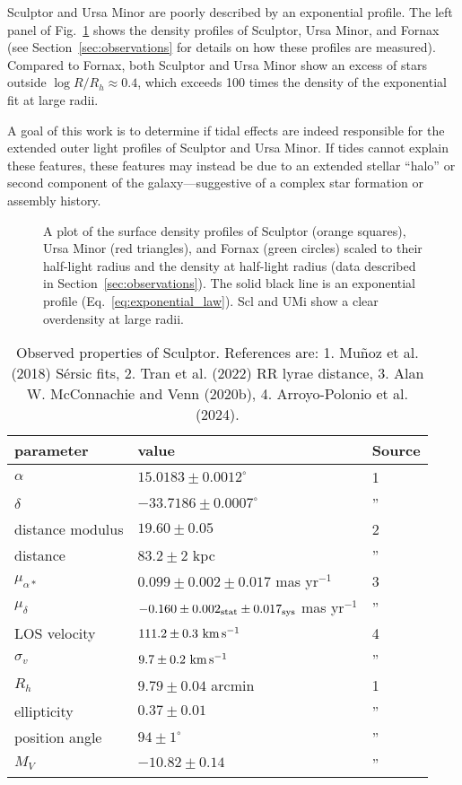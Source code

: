 Sculptor and Ursa Minor are poorly described by an exponential profile.
The left panel of Fig.~\ref{fig:scl_umi_vs_fornax} shows the density
profiles of Sculptor, Ursa Minor, and Fornax (see
Section~\ref{sec:observations} for details on how these profiles are
measured). Compared to Fornax, both Sculptor and Ursa Minor show an
excess of stars outside \(\log R/R_h\approx 0.4\), which exceeds 100
times the density of the exponential fit at large radii.

A goal of this work is to determine if tidal effects are indeed
responsible for the extended outer light profiles of Sculptor and Ursa
Minor. If tides cannot explain these features, these features may
instead be due to an extended stellar ``halo'' or second component of
the galaxy---suggestive of a complex star formation or assembly history.

\begin{figure}
\centering
{}
\caption[Scl and UMi have an extended density profile]{A plot of the
surface density profiles of Sculptor (orange squares), Ursa Minor (red
triangles), and Fornax (green circles) scaled to their half-light radius
and the density at half-light radius (data described in
Section~\ref{sec:observations}). The solid black line is an exponential
profile (Eq.~\ref{eq:exponential_law}). Scl and UMi show a clear
overdensity at large radii.}\label{fig:scl_umi_vs_fornax}
\end{figure}

\begin{table*}[t]
\centering
\caption[Observed Properties of Sculptor]{Observed properties of Sculptor. References are: 1. Muñoz et al. (2018) Sérsic fits, 2. Tran et al. (2022) RR lyrae distance, 3. Alan W. McConnachie and Venn (2020b), 4. Arroyo-Polonio et al. (2024). }
\label{tbl:scl_obs_props}
\begin{tabular}{lll}
\toprule
parameter & value & Source\\
\midrule
$\alpha$ & $15.0183 \pm 0.0012^\circ$ & 1\\
$\delta$ & $-33.7186 \pm 0.0007^\circ$ & ”\\
distance modulus & $19.60 \pm 0.05$ & 2\\
distance & $83.2 \pm 2$ kpc & ”\\
$\mu_{\alpha*}$ & $0.099 \pm 0.002 \pm 0.017$ mas yr$^{-1}$ & 3\\
$\mu_\delta$ & $-0.160 \pm 0.002_{\rm stat} \pm 0.017_{\rm sys}$ mas yr$^{-1}$ & ”\\
LOS velocity & $111.2 \pm 0.3\ {\rm km\,s^{-1}}$ & 4\\
$\sigma_v$ & $9.7\pm0.2\ {\rm km\,s^{-1}}$ & ”\\
$R_h$ & $9.79 \pm 0.04$ arcmin & 1\\
ellipticity & $0.37 \pm 0.01$ & ”\\
position angle & $94\pm1^\circ$ & ”\\
$M_V$ & $-10.82\pm0.14$ & ”\\
\bottomrule
\end{tabular}
\end{table*}

